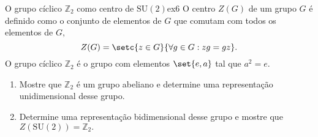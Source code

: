 \begin{exercício}{O grupo cíclico \(\mathbb{Z}_2\) como centro de \(\mathrm{SU}(2)\)}{ex6}
    O centro \(Z(G)\) de um grupo \(G\) é definido como o conjunto de elementos de \(G\) que comutam com todos os elementos de \(G,\) 
    \begin{equation*}
        Z(G) = \setc{z \in G}{\forall g \in G: zg = gz}.
    \end{equation*}
    O grupo cíclico \(\mathbb{Z}_2\) é o grupo com elementos \(\set{e, a}\) tal que \(a^2 = e.\)
    \begin{enumerate}[label=(\alph*)]
        \item Mostre que \(\mathbb{Z}_2\) é um grupo abeliano e determine uma representação unidimensional desse grupo.
        \item Determine uma representação bidimensional desse grupo e mostre que \(Z(\mathrm{SU}(2)) = \mathbb{Z}_2.\)
    \end{enumerate}
\end{exercício}

